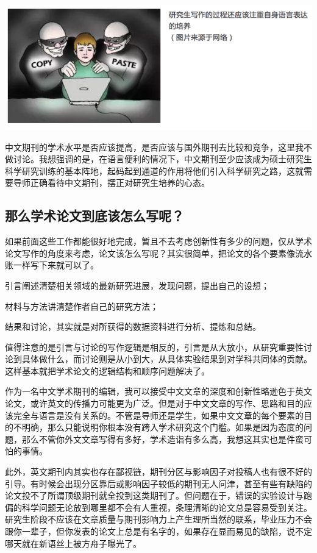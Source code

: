 \documentclass[]{book}
\begin{document}
\includegraphics[width=8.33in]{images/edit5}

中文期刊的学术水平是否应该提高，是否应该与国外期刊去比较和竞争，这里我不做讨论。我想强调的是，在语言便利的情况下，中文期刊至少应该成为硕士研究生科学研究训练的基本阵地，起码起到通道的作用将他们引入科学研究之路，这就需要导师正确看待中文期刊，摆正对研究生培养的心态。

\subsection{那么学术论文到底该怎么写呢？}

如果前面这些工作都能很好地完成，暂且不去考虑创新性有多少的问题，仅从学术论文写作的角度来考虑，论文该怎么写呢？其实很简单，把论文的各个要素像流水账一样写下来就可以了。

引言阐述清楚相关领域的最新研究进展，发现问题，提出自己的设想；

材料与方法讲清楚作者自己的研究方法；

结果和讨论，其实就是对所获得的数据资料进行分析、提炼和总结。

值得注意的是引言与讨论的写作逻辑是相反的，引言是从大放小，从研究重要性讨论到具体做什么，而讨论则是从小到大，从具体实验结果到对学科共同体的贡献。这样基本就把学术论文的逻辑结构和顺序问题解决了。

作为一名中文学术期刊的编辑，我可以接受中文文章的深度和创新性略逊色于英文论文，或许英文的传播力可能更为广泛。但是对于中文文章的写作、思路和目的应该完全与语言是没有关系的。不管是导师还是学生，如果中文文章的每个要素的目的不明确，那么只能说明你根本没有跨入学术研究这个门槛。如果是因为态度的问题，那么不管你外文文章写得有多好，学术造诣有多么高，我想这其实也是件蛮可怕的事情。

此外，英文期刊内其实也存在鄙视链，期刊分区与影响因子对投稿人也有很不好的引导。有时候会出现分区靠后或影响因子较低的期刊无人问津，甚至有些有缺陷的论文投不了所谓顶级期刊就全投到这类期刊了。但问题在于，错误的实验设计与跑偏的科学问题无论放到哪里都不会有人重视，条理清晰的论文总是容易受到关注。研究生阶段不应该在文章质量与期刊影响力上产生理所当然的联系，毕业压力不会跟你一辈子，但你发表的论文上总是有名字的，如果存在显而易见的缺陷，说不定哪天就在新语丝上被方舟子曝光了。
\end{document}

